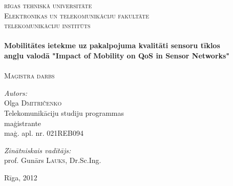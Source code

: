 \begin{titlepage}

\begin{center}
\renewcommand{\baselinestretch}{1.00}\normalsize

\textsc{\LARGE rīgas tehniskā universitāte\\
\normalsize{Elektronikas un telekomunikāciju fakultāte}\\[0.18cm]
\LARGE telekomunikāciju institūts}\\[5.5cm]




\HRule \\[0.4cm]
{ \Large \bfseries {Mobilitātes ietekme uz pakalpojuma kvalitāti sensoru tīklos}\\
 \small angļu valodā "Impact of Mobility on QoS in Sensor Networks"}\\[0.4cm]
\HRule \\[0.6cm]

\textsc{\normalsize Maģistra darbs}\\[6.5cm]

\begin{minipage}[b]{0.47\linewidth}
\begin{flushleft} \large
\emph{Autors:}\\
Olga \textsc{Dmitričenko}\\
\small{Telekomunikāciju studiju programmas\\
maģistrante\\
maģ. apl. nr. 021REB094}\\
\end{flushleft}
\end{minipage}
\begin{minipage}[b]{0.5\linewidth}
\begin{flushright} \large
\emph{Zinātniskais vadītājs:} \\
prof. Gunārs \textsc{Lauks}, Dr.Sc.Ing.\\
\end{flushright}
\end{minipage}
\vspace{3.0cm}


{\large Rīga, 2012}

\end{center}

\end{titlepage}
